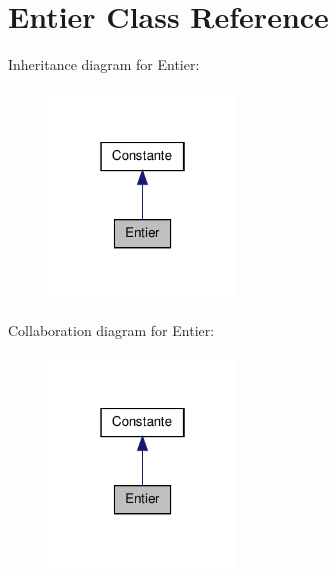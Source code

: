 \hypertarget{class_entier}{\section{\-Entier \-Class \-Reference}
\label{class_entier}
}


\-Inheritance diagram for \-Entier\-:
\nopagebreak
\begin{figure}[H]
\begin{center}
\leavevmode
\includegraphics[width=142pt]{class_entier__inherit__graph}
\end{center}
\end{figure}


\-Collaboration diagram for \-Entier\-:
\nopagebreak
\begin{figure}[H]
\begin{center}
\leavevmode
\includegraphics[width=142pt]{class_entier__coll__graph}
\end{center}
\end{figure}
